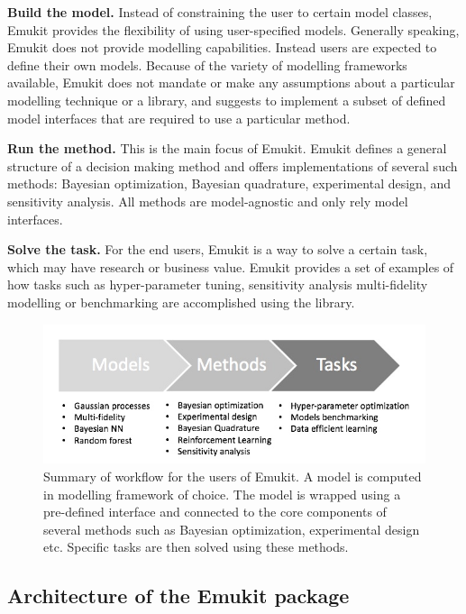 \textbf{Build the model.} Instead of constraining the user to certain model classes, Emukit provides the flexibility of using user-specified models. Generally speaking, Emukit does not provide modelling capabilities. Instead users are expected to define their own models. Because of the variety of modelling frameworks available, Emukit does not mandate or make any assumptions about a particular modelling technique or a library, and suggests to implement a subset of defined model interfaces that are required to use a particular method.

\textbf{Run the method.} This is the main focus of Emukit. Emukit defines a general structure of a decision making method and offers implementations of several such methods: Bayesian optimization, Bayesian quadrature, experimental design, and sensitivity analysis. All methods are model-agnostic and only rely model interfaces.

\textbf{Solve the task.} For the end users, Emukit is a way to solve a certain task, which may have research or business value. Emukit provides a set of examples of how tasks such as hyper-parameter tuning, sensitivity analysis multi-fidelity modelling or benchmarking are accomplished using the library.

\begin{figure}[h]
    \centering
      \includegraphics[scale=0.4]{workflow.png}  
    \caption{Summary of workflow for the users of Emukit. A model is computed in modelling framework of choice. The model is wrapped using a pre-defined interface and connected to the core components of several methods such as Bayesian optimization, experimental design etc. Specific tasks are then solved using these methods.}
    \label{figure:workflow}
\end{figure}

\subsection{Architecture of the Emukit package}

